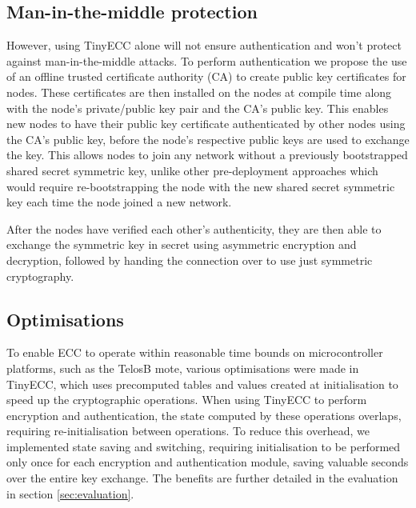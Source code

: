 \documentclass[conference]{./sty/IEEEtran}
\begin{document}
\subsection{Man-in-the-middle protection} %
\label{sub:man_in_the_middle_protection}
However, using TinyECC alone will not ensure authentication and won't protect against man-in-the-middle attacks. To perform authentication we propose the use of an offline trusted certificate authority (CA) to create public key certificates for nodes. These certificates are then installed on the nodes at compile time along with the node's private/public key pair and the CA's public key. This enables new nodes to have their public key certificate authenticated by other nodes using the CA's public key, before the node's respective public keys are used to exchange the key. This allows nodes to join any network without a previously bootstrapped shared secret symmetric key, unlike other pre-deployment approaches which would require re-bootstrapping the node with the new shared secret symmetric key each time the node joined a new network.

After the nodes have verified each other's authenticity, they are then able to exchange the symmetric key in secret using asymmetric encryption and decryption, followed by handing the connection over to use just symmetric cryptography. 

\subsection{Optimisations} %
\label{sub:optimisations}
To enable ECC to operate within reasonable time bounds on microcontroller platforms, such as the TelosB mote, various optimisations were made in TinyECC, which uses precomputed tables and values created at initialisation to speed up the cryptographic operations. When using TinyECC to perform encryption and authentication, the state computed by these operations overlaps, requiring re-initialisation between operations. To reduce this overhead, we implemented state saving and switching, requiring initialisation to be performed only once for each encryption and authentication module, saving valuable seconds over the entire key exchange. The benefits are further detailed in the evaluation in section \ref{sec:evaluation}.
\end{document}

